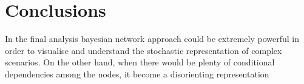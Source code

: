 \documentclass{article}
\begin{document}
	
\newpage
			\part{Conclusions}
				
In the final analysis bayesian network approach could be extremely powerful in order to visualise and understand the stochastic representation of complex scenarios. On the other hand, when there would be plenty of conditional dependencies among the nodes, it become a disorienting representation 

			
		
\end{document}
